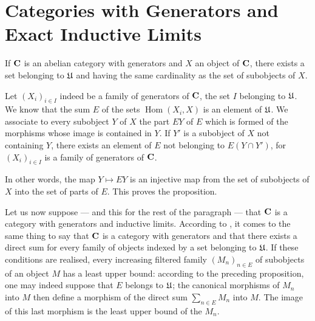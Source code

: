 
\section{Categories with Generators and Exact Inductive Limits}

\begin{proposition}
If $\mathbf{C}$ is an abelian category with generators and $X$ an object of $\mathbf{C}$,
there exists a set belonging to $\mathfrak{U}$ and having the same cardinality as
the set of subobjects of $X$.
\end{proposition}

Let $(X_i)_{i\in I}$ indeed be a family of generators of $\mathbf{C}$, the set $I$
belonging to $\mathfrak{U}$. We know that the sum $E$ of the sets
$\operatorname{Hom}(X_i, X)$ is an element of $\mathfrak{U}$. We associate to every
subobject $Y$ of $X$ the part $EY$ of $E$ which is formed of the morphisms
whose image is contained in $Y$. If $Y'$ is a subobject of $X$ not
containing $Y$, there exists an element of $E$ not belonging to
$E(Y \cap Y')$, for $(X_i)_{i\in I}$ is a family of generators of $\mathbf{C}$.

In other words, the map $Y\mapsto EY$ is an injective map from the set of
subobjects of $X$ into the set of parts of $E$. This proves the proposition.

Let us now suppose --- and this for the rest of the paragraph --- that $\mathbf{C}$
is a category with generators and inductive limits. According to \cite{grothendieck-1}, it
comes to the same thing to say that $\mathbf{C}$ is a category with generators and
that there exists a direct sum for every family of objects indexed by a set
belonging to $\mathfrak{U}$. If these conditions are realised, every increasing
filtered family $(M_n)_{n\in E}$ of subobjects of an object $M$ has a least
upper bound: according to the preceding proposition, one may indeed suppose
that $E$ belongs to $\mathfrak{U}$; the canonical morphisms of $M_n$ into $M$ then
define a morphism of the direct sum $\sum_{n\in E} M_n$ into $M$. The image
of this last morphism is the least upper bound of the $M_n$.

